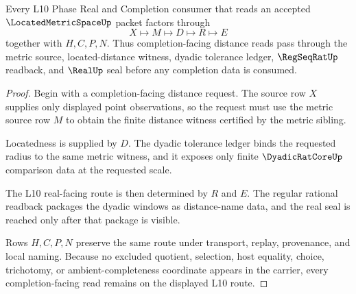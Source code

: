 \begin{theorem}
\label{thm:located-metric-space-l10-completion-route}
Every L10 Phase Real and Completion consumer that reads an accepted $\LocatedMetricSpaceUp$ packet factors through
$$
X\longmapsto M\longmapsto D\longmapsto R\longmapsto E
$$
together with $H,C,P,N$. Thus completion-facing distance reads pass through the metric source, located-distance witness, dyadic tolerance ledger, $\RegSeqRatUp$ readback, and $\RealUp$ seal before any completion data is consumed.
\end{theorem}
\begin{proof}
Begin with a completion-facing distance request. The source row $X$ supplies only displayed point observations, so the request must use the metric source row $M$ to obtain the finite distance witness certified by the metric sibling.

Locatedness is supplied by $D$. The dyadic tolerance ledger binds the requested radius to the same metric witness, and it exposes only finite $\DyadicRatCoreUp$ comparison data at the requested scale.

The L10 real-facing route is then determined by $R$ and $E$. The regular rational readback packages the dyadic windows as distance-name data, and the real seal is reached only after that package is visible.

Rows $H,C,P,N$ preserve the same route under transport, replay, provenance, and local naming. Because no excluded quotient, selection, host equality, choice, trichotomy, or ambient-completeness coordinate appears in the carrier, every completion-facing read remains on the displayed L10 route.
\end{proof}




